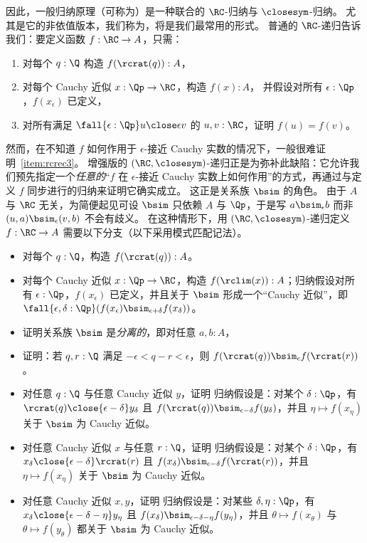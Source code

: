 因此，一般归纳原理（可称为）是一种联合的 $\RC$-归纳与 $\closesym$-归纳。
尤其是它的非依值版本，我们称为，将是我们最常用的形式。
%
普通的 $\RC$-递归告诉我们：要定义函数 $f : \RC \to A$，只需：
\begin{enumerate}
\item 对每个 $q : \Q$ 构造 $f(\rcrat(q)) : A$，
\item 对每个 Cauchy 近似 $x : \Qp \to \RC$，构造 $f(x) : A$，
  并假设对所有 $\epsilon : \Qp$，$f(x_\epsilon)$ 已定义，
\item 对所有满足 $\fall{\epsilon:\Qp} u\close\epsilon v$ 的 $u, v : \RC$，证明 $f(u) = f(v)$。\label{item:rcrec3}
\end{enumerate}
然而，在不知道 $f$ 如何作用于 $\epsilon$-接近 Cauchy 实数的情况下，一般很难证明~\ref{item:rcrec3}。
增强版的 $(\RC,\closesym)$-递归正是为弥补此缺陷：它允许我们预先指定一个\emph{任意的}“$f$ 在 $\epsilon$-接近 Cauchy 实数上如何作用”的方式，再通过与定义 $f$ 同步进行的归纳来证明它确实成立。
这正是关系族 $\bsim$ 的角色。
由于 $A$ 与 $\RC$ 无关，为简便起见可设 $\bsim$ 只依赖 $A$ 与 $\Qp$，于是写 $a\bsim_\epsilon b$ 而非 $(u,a) \bsim_\epsilon (v,b)$ 不会有歧义。
在这种情形下，用 $(\RC,\closesym)$-递归定义 $f:\RC\to A$ 需要以下分支（以下采用模式匹配记法）。
\begin{itemize}
\item 对每个 $q : \Q$，构造 $f(\rcrat(q)) : A$。
\item 对每个 Cauchy 近似 $x : \Qp \to \RC$，构造 $f(\rclim(x)) : A$；归纳假设对所有 $\epsilon : \Qp$，$f(x_\epsilon)$ 已定义，并且关于 $\bsim$ 形成一个“Cauchy 近似”，即 $\fall{\epsilon,\delta:\Qp} (f(x_\epsilon) \bsim_{\epsilon+\delta} f(x_\delta))$。
\item 证明关系族 $\bsim$ 是\emph{分离的}，即对任意 $a,b:A$，
\item 证明：若 $q,r:\Q$ 满足 $-\epsilon< q-r <\epsilon$，则 $f(\rcrat(q))\bsim_\epsilon f(\rcrat(r))$。
\item 对任意 $q:\Q$ 与任意 Cauchy 近似 $y$，证明
 归纳假设是：对某个 $\delta:\Qp$，有 $\rcrat(q)\close{\epsilon-\delta} y_\delta$ 且 $f(\rcrat(q)) \bsim_{\epsilon-\delta} f(y_\delta)$，并且 $\eta \mapsto f(x_\eta)$ 关于 $\bsim$ 为 Cauchy 近似。
\item 对任意 Cauchy 近似 $x$ 与任意 $r:\Q$，证明
归纳假设是：对某个 $\delta:\Qp$，有 $x_\delta \close{\epsilon-\delta} \rcrat(r)$ 且 $f(x_\delta) \bsim_{\epsilon-\delta} f(\rcrat(r))$，并且 $\eta\mapsto f(x_\eta)$ 关于 $\bsim$ 为 Cauchy 近似。
\item 对任意 Cauchy 近似 $x,y$，证明
归纳假设是：对某些 $\delta,\eta:\Qp$，有 $x_\delta \close{\epsilon-\delta-\eta} y_\eta$ 且 $f(x_\delta) \bsim_{\epsilon-\delta-\eta} f(y_\eta)$，并且 $\theta\mapsto f(x_\theta)$ 与 $\theta\mapsto f(y_\theta)$ 都关于 $\bsim$ 为 Cauchy 近似。
\end{itemize}
